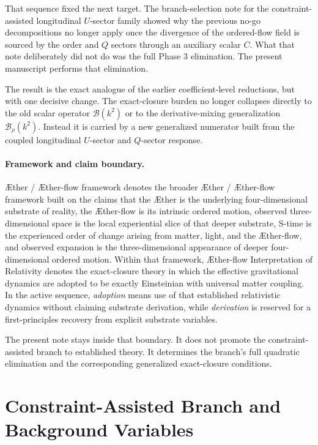 \documentclass[11pt]{article}
\newcommand{\Aether}{\AE{}ther}
\newcommand{\Aflow}{\AE{}ther-flow}
\newcommand{\TheoryName}{\Aflow{} Interpretation of Relativity}
\newcommand{\TheoryProgram}{\Aether{} / \Aflow{} framework}
\begin{document}
That sequence fixed the next target. The branch-selection note for the constraint-assisted longitudinal \(U\)-sector family showed why the previous no-go decompositions no longer apply once the divergence of the ordered-flow field is sourced by the order and \(Q\) sectors through an auxiliary scalar \(C\). What that note deliberately did not do was the full Phase 3 elimination. The present manuscript performs that elimination.

The result is the exact analogue of the earlier coefficient-level reductions, but with one decisive change. The exact-closure burden no longer collapses directly to the old scalar operator \(\mathcal B(k^2)\) or to the derivative-mixing generalization \(\mathcal B_\rho(k^2)\). Instead it is carried by a new generalized numerator built from the coupled longitudinal \(U\)-sector and \(Q\)-sector response.

\paragraph{Framework and claim boundary.}
\TheoryProgram{} denotes the broader \Aether{} / \Aflow{} framework built on the claims that the \Aether{} is the underlying four-dimensional substrate of reality, the \Aflow{} is its intrinsic ordered motion, observed three-dimensional space is the local experiential slice of that deeper substrate, S-time is the experienced order of change arising from matter, light, and the \Aflow{}, and observed expansion is the three-dimensional appearance of deeper four-dimensional ordered motion. Within that framework, \TheoryName{} denotes the exact-closure theory in which the effective gravitational dynamics are adopted to be exactly Einsteinian with universal matter coupling. In the active sequence, \emph{adoption} means use of that established relativistic dynamics without claiming substrate derivation, while \emph{derivation} is reserved for a first-principles recovery from explicit substrate variables.

The present note stays inside that boundary. It does not promote the constraint-assisted branch to established theory. It determines the branch's full quadratic elimination and the corresponding generalized exact-closure conditions.

\section{Constraint-Assisted Branch and Background Variables}
\end{document}
